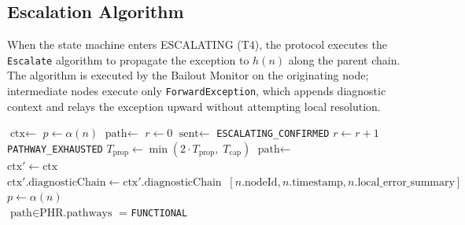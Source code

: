 \subsection{Escalation Algorithm}\label{sec:bailout-escalation-algorithm}

When the state machine enters ESCALATING (T4), the protocol executes the \texttt{Escalate} algorithm to propagate the exception to $h(n)$ along the parent chain. The algorithm is executed by the Bailout Monitor on the originating node; intermediate nodes execute only \texttt{ForwardException}, which appends diagnostic context and relays the exception upward without attempting local resolution.

\begin{algorithm}[htbp]
\caption{Bailout Protocol escalation algorithm.}
\label{alg:escalate}
\begin{algorithmic}[1]
  \State $\text{ctx} \leftarrow$ 
  \State $p \leftarrow \alpha(n)$ 
  \State $\text{path} \leftarrow$ 
  \State $r \leftarrow 0$ 
    \State $\text{sent} \leftarrow$ 
      \State \Return \texttt{ESCALATING\_CONFIRMED}
    \EndIf
    \State $r \leftarrow r + 1$
      \State {}
      \State {}
      \State \Return \texttt{PATHWAY\_EXHAUSTED}
    \EndIf
    \State $T_{\text{prop}} \leftarrow \min(2 \cdot T_{\text{prop}},\; T_{\text{cap}})$
    \State {}
    \State $\text{path} \leftarrow$ 
  \EndWhile
\EndProcedure
\\[4pt]
  \State $\text{ctx}' \leftarrow \text{ctx}$
  \State $\text{ctx}'.\text{diagnosticChain} \leftarrow \text{ctx}'.\text{diagnosticChain} \;\;[n.\text{nodeId}, n.\text{timestamp}, n.\text{local\_error\_summary}]$
  \State $p \leftarrow \alpha(n)$
  \State {}
\EndProcedure
\\[4pt]
  \State \Return $\text{path} \in \text{PHR.pathways}$   = \texttt{FUNCTIONAL}
\EndProcedure
\end{algorithmic}
\end{algorithm}

